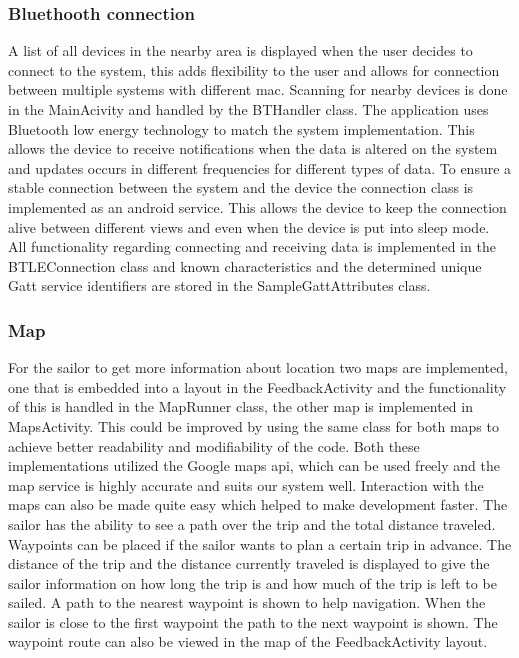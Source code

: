 \subsubsection{Bluethooth connection}
A list of all devices in the nearby area is displayed when the user decides to connect to the system, this adds flexibility to the user and allows for connection between multiple systems with different \gls{mac}. Scanning for nearby devices is done in the MainAcivity and handled by the BTHandler class. The application uses Bluetooth low energy technology to match the system implementation. This allows the device to receive notifications when the data is altered on the system and updates occurs in different frequencies for different types of data. To ensure a stable connection between the system and the device the connection class is implemented as an android service\cite{android-service}. This allows the device to keep the connection alive between different views and even when the device is put into sleep mode. All functionality regarding connecting and receiving data is implemented in the BTLEConnection class and known characteristics and the determined unique Gatt service identifiers are stored in the SampleGattAttributes class.

\subsubsection{Map}
For the sailor to get more information about location two maps are implemented, one that is embedded into a layout in the FeedbackActivity and the functionality of this is handled in the MapRunner class, the other map is implemented in MapsActivity. This could be improved by using the same class for both maps to achieve better readability and modifiability of the code. Both these implementations utilized the Google maps \gls{api}\cite{gmaps}, which can be used freely and the map service is highly accurate and suits our system well. Interaction with the maps can also be made quite easy which helped to make development faster. The sailor has the ability to see a path over the trip and the total distance traveled. Waypoints can be placed if the sailor wants to plan a certain trip in advance. The distance of the trip and the distance currently traveled is displayed to give the sailor information on how long the trip is and how much of the trip is left to be sailed. A path to the nearest waypoint is shown to help navigation. When the sailor is close to the first waypoint the path to the next waypoint is shown. The waypoint route can also be viewed in the map of the FeedbackActivity layout.

